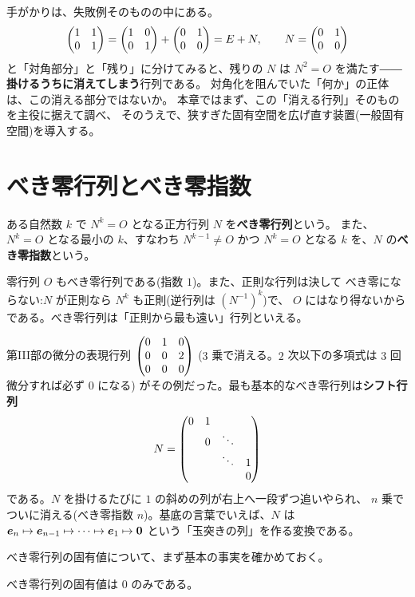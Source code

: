 手がかりは、失敗例そのものの中にある。
\[
\begin{pmatrix}1 & 1 \\ 0 & 1\end{pmatrix} = \begin{pmatrix}1 & 0 \\ 0 & 1\end{pmatrix} + \begin{pmatrix}0 & 1 \\ 0 & 0\end{pmatrix}
= E + N, \qquad N = \begin{pmatrix}0 & 1 \\ 0 & 0\end{pmatrix}
\]
と「対角部分」と「残り」に分けてみると、残りの $N$ は
$N^2 = O$ を満たす――\textbf{掛けるうちに消えてしまう}行列である。
対角化を阻んでいた「何か」の正体は、この消える部分ではないか。
本章ではまず、この「消える行列」そのものを主役に据えて調べ、
そのうえで、狭すぎた固有空間を広げ直す装置(一般固有空間)を導入する。

\section{べき零行列とべき零指数}

\begin{teigi}
ある自然数 $k$ で $N^k = O$ となる正方行列 $N$ を\textbf{べき零行列}という。
また、$N^k = O$ となる最小の $k$、すなわち
$N^{k-1} \neq O$ かつ $N^k = O$ となる $k$ を、$N$ の\textbf{べき零指数}という。
\end{teigi}

\begin{chui}
零行列 $O$ もべき零行列である(指数 $1$)。また、正則な行列は決して
べき零にならない:$N$ が正則なら $N^k$ も正則(逆行列は $(N^{-1})^k$)で、
$O$ にはなり得ないからである。べき零行列は「正則から最も遠い」行列といえる。
\end{chui}

第III部の微分の表現行列 $\begin{pmatrix}0 & 1 & 0 \\ 0 & 0 & 2 \\ 0 & 0 & 0\end{pmatrix}$
($3$ 乗で消える。$2$ 次以下の多項式は $3$ 回微分すれば必ず $0$ になる)
がその例だった。最も基本的なべき零行列は\textbf{シフト行列}
\[
N = \begin{pmatrix}0 & 1 & & \\ & 0 & \ddots & \\ & & \ddots & 1 \\ & & & 0\end{pmatrix}
\]
である。$N$ を掛けるたびに $1$ の斜めの列が右上へ一段ずつ追いやられ、
$n$ 乗でついに消える(べき零指数 $n$)。基底の言葉でいえば、$N$ は
$\bm{e}_n \mapsto \bm{e}_{n-1} \mapsto \cdots \mapsto \bm{e}_1 \mapsto \bm{0}$
という「玉突きの列」を作る変換である。

べき零行列の固有値について、まず基本の事実を確かめておく。

\begin{teiri}[べき零行列の固有値]\label{thm:nilp-eigen}
べき零行列の固有値は $0$ のみである。
\end{teiri}

